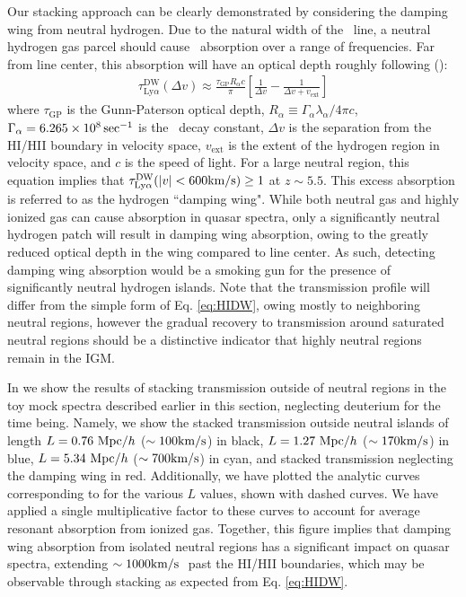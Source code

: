 Our stacking approach can be clearly demonstrated by considering the damping wing from neutral hydrogen. Due to the natural width of the \lya\ line, a neutral hydrogen gas parcel should cause \lya\ absorption over a range of frequencies. Far from line center, this absorption will have an optical depth roughly following (\citealt{MiraldaEscude:1997en}):
\begin{align}
\tau_{\text{Ly}\alpha}^{\text{DW}}(\Delta v) \approx \frac{\tau_{\text{GP}}R_{\alpha}c}{\pi}\left[ \frac{1}{\Delta v} - \frac{1}{\Delta v + v_{\text{ext}}} \right]  \label{eq:HIDW}
\end{align}
where $\tau_{\text{GP}}$ is the Gunn-Paterson optical depth, $R_{\alpha} \equiv \Gamma_{\alpha}\lambda_{\alpha}/4\pi c$, $\Gamma_{\alpha} = 6.265 \times 10^{8}\sec^{-1}$ is the \lya\ decay constant, $\Delta v$ is the separation from the HI/HII boundary in velocity space, $v_{\text{ext}}$ is the extent of the hydrogen region in velocity space, and $c$ is the speed of light. For a large neutral region, this equation implies that $\tau^{\text{DW}}_{\text{Ly}\alpha}(|v| < 600\text{km}/\text{s}) \geq 1$ at $z \sim 5.5$. This excess absorption is referred to as the hydrogen ``damping wing". While both neutral gas and highly ionized gas can cause absorption in quasar spectra, only a significantly neutral hydrogen patch will result in damping wing absorption, owing to the greatly reduced optical depth in the wing compared to line center. As such, detecting damping wing absorption would be a smoking gun for the presence of significantly neutral hydrogen islands. Note that the transmission profile will differ from the simple form of Eq. \ref{eq:HIDW},
owing mostly to neighboring neutral regions, however the gradual recovery to transmission around saturated neutral regions should be a distinctive indicator that highly neutral regions remain in the IGM.


In  we show the results of stacking transmission outside of neutral regions in the toy mock spectra described earlier in this section, neglecting deuterium for the time being. Namely, we show the stacked transmission outside neutral islands of length $L = 0.76 \ \text{Mpc/$h$}$ ($\sim 100\text{km}/\text{s}$) in black, $L = 1.27 \ \text{Mpc/$h$}$ ($\sim 170\text{km}/\text{s}$) in blue, $L = 5.34\ \text{Mpc/$h$}$ ($\sim 700\text{km}/\text{s}$) in cyan, and stacked transmission neglecting the damping wing in red. Additionally, we have plotted the analytic curves corresponding to  for the various $L$ values, shown with dashed curves. We have applied a single multiplicative factor to these curves to account for average resonant absorption from ionized gas. Together, this figure implies that damping wing absorption from isolated neutral regions has a significant impact on quasar spectra, extending $\sim 1000\kms\ $ past the HI/HII boundaries, which may be observable through stacking as expected from Eq. \ref{eq:HIDW}. 

